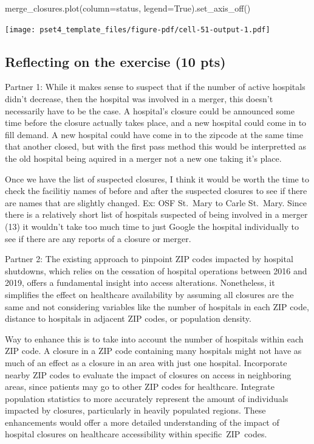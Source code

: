 \documentclass[
  letterpaper,
  DIV=11,
  numbers=noendperiod]{scrartcl}
\newenvironment{Shaded}{\begin{snugshade}}{\end{snugshade}}
\newcommand{\NormalTok}[1]{\textcolor[rgb]{0.00,0.23,0.31}{#1}}
\newcommand{\OperatorTok}[1]{\textcolor[rgb]{0.37,0.37,0.37}{#1}}
\newcommand{\StringTok}[1]{\textcolor[rgb]{0.13,0.47,0.30}{#1}}
\newcommand{\VariableTok}[1]{\textcolor[rgb]{0.07,0.07,0.07}{#1}}
\begin{document}
\begin{Shaded}
\begin{Highlighting}[]
\NormalTok{merge\_closures.plot(column}\OperatorTok{=}\StringTok{\textquotesingle{}status\textquotesingle{}}\NormalTok{, legend}\OperatorTok{=}\VariableTok{True}\NormalTok{).set\_axis\_off()}
\end{Highlighting}
\end{Shaded}

\texttt{[image: pset4\_template\_files/figure-pdf/cell-51-output-1.pdf]}

\subsection{Reflecting on the exercise (10
pts)}\label{reflecting-on-the-exercise-10-pts}

Partner 1: While it makes sense to suspect that if the number of active
hospitals didn't decrease, then the hospital was involved in a merger,
this doesn't necessarily have to be the case. A hospital's closure could
be announced some time before the closure actually takes place, and a
new hospital could come in to fill demand. A new hospital could have
come in to the zipcode at the same time that another closed, but with
the first pass method this would be interpretted as the old hospital
being aquired in a merger not a new one taking it's place.

Once we have the list of suspected closures, I think it would be worth
the time to check the facilitiy names of before and after the suspected
closures to see if there are names that are slightly changed. Ex: OSF
St.~Mary to Carle St.~Mary. Since there is a relatively short list of
hospitals suspected of being involved in a merger (13) it wouldn't take
too much time to just Google the hospital individually to see if there
are any reports of a closure or merger.

Partner 2: The existing approach to pinpoint ZIP codes impacted by
hospital shutdowns, which relies on the cessation of hospital operations
between 2016 and 2019, offers a fundamental insight into access
alterations. Nonetheless, it simplifies the effect on healthcare
availability by assuming all closures are the same and not considering
variables like the number of hospitals in each ZIP code, distance to
hospitals in adjacent ZIP codes, or population density.

Way to enhance this is to take into account the number of hospitals
within each ZIP code. A closure in a ZIP code containing many hospitals
might not have as much of an effect as a closure in an area with just
one hospital. Incorporate nearby ZIP codes to evaluate the impact of
closures on access in neighboring areas, since patients may go to other
ZIP codes for healthcare. Integrate population statistics to more
accurately represent the amount of individuals impacted by closures,
particularly in heavily populated regions. These enhancements would
offer a more detailed understanding of the impact of hospital closures
on healthcare accessibility within specific~ZIP~codes.
\end{document}
